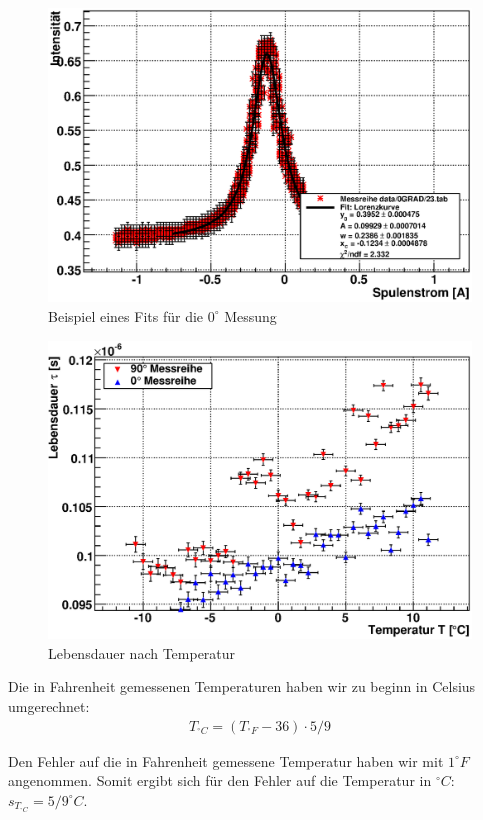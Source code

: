 \documentclass[12pt]{article}
\begin{document}
\begin{figure}[H]  
\centering
\includegraphics[width=0.9\linewidth]{pictures/023eps.eps}
\caption{Beispiel eines Fits für die $0^\circ$ Messung}
\end{figure}

\begin{figure}[H]  
\centering
\includegraphics[width=0.9\linewidth]{pictures/lebensdauer_temp.eps}
\caption{Lebensdauer nach Temperatur}
\label{leben_temp}
\end{figure}

Die in Fahrenheit gemessenen Temperaturen haben wir zu beginn in Celsius umgerechnet:
\begin{align}
 T_{^\circ C} = (T_{^\circ F} - 36) \cdot 5 / 9
\end{align}

Den Fehler auf die in Fahrenheit gemessene Temperatur haben wir mit $1^\circ F$ angenommen. Somit ergibt sich für den Fehler auf die Temperatur in
$^\circ C$: $s_{T_{^\circ C}} = 5 / 9 ^\circ C$.
\end{document}
